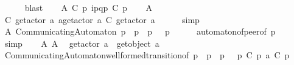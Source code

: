 \begin{isabellebody}
\ \ \ \ \isamarkupfalse%
\ blast\isanewline
\ \ \isamarkupfalse%
\ A{}{\isacharcolon}{\kern0pt}\ {\isachardoublequoteopen}C{}\ p\ {\isasymmidarrow}{\isacharbang}{\kern0pt}{\isasymlangle}{\isacharparenleft}{\kern0pt}i\isactrlbsup p{\isasymrightarrow}q\isactrlesup {\isacharparenright}{\kern0pt}{\isasymrangle}{\isasymrightarrow}p\ {\isacharparenleft}{\kern0pt}C{}\ p{\isacharparenright}{\kern0pt}{\isachardoublequoteclose}\isanewline
\ \ \isamarkupfalse%
\ A{}\ \isamarkupfalse%
\ {\isachardoublequoteopen}C{}\ {\isacharparenleft}{\kern0pt}get{\isacharunderscore}{\kern0pt}actor\ a{\isacharparenright}{\kern0pt}\ {\isasymmidarrow}a{\isasymrightarrow}{\isacharparenleft}{\kern0pt}get{\isacharunderscore}{\kern0pt}actor\ a{\isacharparenright}{\kern0pt}\ {\isacharparenleft}{\kern0pt}C{}\ {\isacharparenleft}{\kern0pt}get{\isacharunderscore}{\kern0pt}actor\ a{\isacharparenright}{\kern0pt}{\isacharparenright}{\kern0pt}{\isachardoublequoteclose}\isanewline
\ \ \ \ \isamarkupfalse%
\ simp\isanewline
\ \ \isamarkupfalse%
\ A{}{\isacharcolon}{\kern0pt}\ {\isachardoublequoteopen}CommunicatingAutomaton\ p\ {\isacharparenleft}{\kern0pt}{\isasymS}\ p{\isacharparenright}{\kern0pt}\ {\isacharparenleft}{\kern0pt}{\isasymI}\ p{\isacharparenright}{\kern0pt}\ {\isasymM}\ {\isacharparenleft}{\kern0pt}{\isasymR}\ p{\isacharparenright}{\kern0pt}{\isachardoublequoteclose}\isanewline
\ \ \ \ \isamarkupfalse%
\ automaton{\isacharunderscore}{\kern0pt}of{\isacharunderscore}{\kern0pt}peer{\isacharbrackleft}{\kern0pt}of\ p{\isacharbrackright}{\kern0pt}\isanewline
\ \ \ \ \isamarkupfalse%
\ simp\isanewline
\ \ \isamarkupfalse%
\ A{}\ A{}\ \isamarkupfalse%
\ {\isachardoublequoteopen}get{\isacharunderscore}{\kern0pt}actor\ a\ {\isasymnoteq}\ get{\isacharunderscore}{\kern0pt}object\ a{\isachardoublequoteclose}\isanewline
\ \ \ \ \isamarkupfalse%
\ CommunicatingAutomaton{\isachardot}{\kern0pt}well{\isacharunderscore}{\kern0pt}formed{\isacharunderscore}{\kern0pt}transition{\isacharbrackleft}{\kern0pt}of\ p\ {\isachardoublequoteopen}{\isasymS}\ p{\isachardoublequoteclose}\ {\isachardoublequoteopen}{\isasymI}\ p{\isachardoublequoteclose}\ {\isasymM}\ {\isachardoublequoteopen}{\isasymR}\ p{\isachardoublequoteclose}\ {\isachardoublequoteopen}C{}\ p{\isachardoublequoteclose}\ a\ {\isachardoublequoteopen}C{}\ p{\isachardoublequoteclose}{\isacharbrackright}{\kern0pt}\isanewline

\end{isabellebody}
